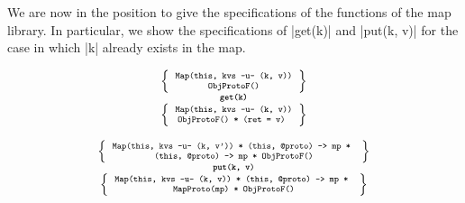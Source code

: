 

We are now in the position to give the specifications of the functions of the map library. In particular, 
 we show the specifications of \jsinline|get(k)| and \jsinline|put(k, v)| for the case in which
 \jsinline|k| already exists in the map. 

\begin{minipage}{0.3\textwidth}
\begin{displaymath} 
{\scriptsize
\begin{array}{c}
\left\{ {\begin{array}{c}
 \text{\texttt{Map(this, kvs -u- (k, v))}} \\ 
  \text{\texttt{ObjProtoF()}} 
\end{array}} \right\} \\
%
\text{\bfseries \texttt{get(k)}} \\[0.2mm]
%
\left\{ {\begin{array}{c}
 \text{\texttt{Map(this, kvs -u- (k, v))}} \\
  \text{\texttt{ObjProtoF() * (ret = v) }} \\
\end{array}} \right\}
\end{array}
} 
\end{displaymath}
\end{minipage}
\begin{minipage}{0.72\textwidth}
%
\begin{displaymath} 
{\scriptsize
\begin{array}{c}
\left\{ {\begin{array}{c}
 \text{\texttt{Map(this, kvs -u- (k, v')) * (this, @proto) -> mp * }} \\ 
 \text{\texttt{(this, @proto) -> mp * ObjProtoF()}} 
\end{array}} \right\} \\
%
\text{\bfseries \texttt{put(k, v)}} \\[0.2mm]
%
\left\{ {\begin{array}{c}
 \text{\texttt{Map(this, kvs -u- (k, v)) * (this, @proto) -> mp * }} \\
 \text{\texttt{MapProto(mp) * ObjProtoF()}} 
\end{array}} \right\}
\end{array}
} 
\end{displaymath}
\end{minipage}

